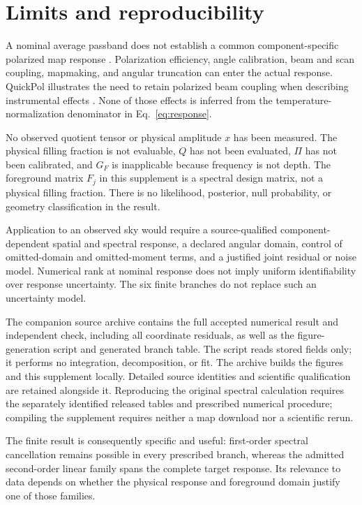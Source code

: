 \documentclass[aps,prd,preprint,nofootinbib,11pt]{revtex4-2}
\begin{document}
\section{Limits and reproducibility}
A nominal average passband does not establish a common component-specific polarized map response \cite{planckIV}. Polarization efficiency, angle calibration, beam and scan coupling, mapmaking, and angular truncation can enter the actual response. QuickPol illustrates the need to retain polarized beam coupling when describing instrumental effects \cite{quickpol}. None of those effects is inferred from the temperature-normalization denominator in Eq.~\eqref{eq:response}.

No observed quotient tensor or physical amplitude $x$ has been measured. The physical filling fraction is not evaluable, $Q$ has not been evaluated, $\Pi$ has not been calibrated, and $G_F$ is inapplicable because frequency is not depth. The foreground matrix $F_j$ in this supplement is a spectral design matrix, not a physical filling fraction. There is no likelihood, posterior, null probability, or geometry classification in the result.

Application to an observed sky would require a source-qualified component-dependent spatial and spectral response, a declared angular domain, control of omitted-domain and omitted-moment terms, and a justified joint residual or noise model. Numerical rank at nominal response does not imply uniform identifiability over response uncertainty. The six finite branches do not replace such an uncertainty model.

The companion source archive contains the full accepted numerical result and independent check, including all coordinate residuals, as well as the figure-generation script and generated branch table. The script reads stored fields only; it performs no integration, decomposition, or fit. The archive builds the figures and this supplement locally. Detailed source identities and scientific qualification are retained alongside it. Reproducing the original spectral calculation requires the separately identified released tables and prescribed numerical procedure; compiling the supplement requires neither a map download nor a scientific rerun.

The finite result is consequently specific and useful: first-order spectral cancellation remains possible in every prescribed branch, whereas the admitted second-order linear family spans the complete target response. Its relevance to data depends on whether the physical response and foreground domain justify one of those families.


\end{document}
